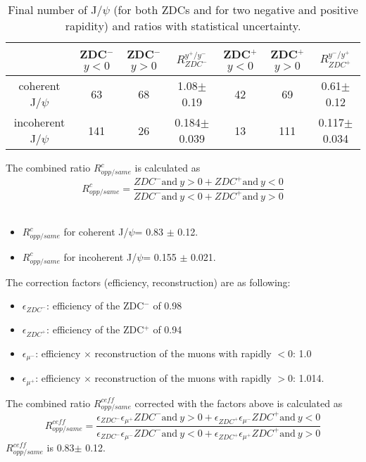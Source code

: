     \begin{table}[h]
    \begin{center}
    
    \caption{Final number of J/$\psi$ (for both ZDCs and for two negative and positive rapidity) and ratios with statistical uncertainty.}
    \label{tab:uref}
    \begin{tabular}{|c|c|c|c|c|c|c|}
    \hline
    & ZDC$^{-}$ $y<0$ & ZDC$^{-}$ $y>0$ & $R_{ZDC^{-}}^{y^{+}/y^{-}}$  & ZDC$^{+}$ $y<0$& ZDC$^{+}$ $y>0$& $R_{ZDC^{+}}^{y^{-}/y^{+}}$ \\ 
    \hline
    coherent J/$\psi$ & 63&68&1.08$\pm$0.19& 42&69 & 0.61$\pm$0.12 \\
    \hline
     incoherent J/$\psi$ &141 &26&0.184$\pm$0.039& 13&111& 0.117$\pm$0.034\\
    \hline
    \end{tabular}
    \end{center}
    
    \end{table}
    
    The combined ratio $R_{opp/same}^{c}$ is calculated as \\
      $$ R_{opp/same}^{c} = \frac{ZDC^{-} \mbox{and}~y>0 + ZDC^{+} 
      \mbox{and}~y<0}{ZDC^{-} \mbox{and}~y<0 + ZDC^{+} \mbox{and}~y>0} $$\\
    \begin{itemize}
      \item $ R_{opp/same}^{c}$ for coherent J/$\psi$= 0.83 $\pm$ 0.12.
      \item $ R_{opp/same}^{c}$ for incoherent J/$\psi$= 0.155 $\pm$ 0.021.
    \end{itemize}
    
    The correction factors (efficiency, reconstruction) are as following: 
    \begin{itemize}
      \item $\epsilon_{ZDC^{-}}$: efficiency of the ZDC$^{-}$ of 0.98
      \item $\epsilon_{ZDC^{+}}$: efficiency of the ZDC$^{+}$ of 0.94\ 
      \item $\epsilon_{\mu^{-}}$: efficiency $\times$ reconstruction of the muons 
        with rapidly $<$0: 1.0 
      \item $\epsilon_{\mu^{+}}$: efficiency $\times$ reconstruction of the muons 
        with rapidly $>$0: 1.014. 
    \end{itemize}
    
    The combined ratio  $R_{opp/same}^{ceff}$ corrected with the factors  above is 
      calculated as \\
      $$ R_{opp/same}^{ceff} = \frac{\epsilon_{ZDC^{-}} \epsilon_{\mu^{+}} ZDC^{-} 
        \mbox{and}~y>0 + \epsilon_{ZDC^{+}} \epsilon_{\mu^{-}} ZDC^{+} 
        \mbox{and}~y<0}{\epsilon_{ZDC^{-}} \epsilon_{\mu^{-}} ZDC^{-} 
        \mbox{and}~y<0 + \epsilon_{ZDC^{+}} \epsilon_{\mu^{+}} ZDC^{+} 
        \mbox{and}~y>0} $$
      $R_{opp/same}^{ceff}$ is 0.83$\pm$ 0.12.    \\
    

